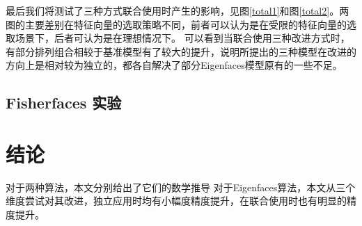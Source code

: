 \documentclass{ctexart}
\begin{document}
    最后我们将测试了三种方式联合使用时产生的影响，见图\ref{total1}和图\ref{total2}。两图的主要差别在特征向量的选取策略不同，前者可以认为是在受限的特征向量的选取场景下，后者可认为是在理想情况下。
    可以看到当联合使用三种改进方式时，有部分排列组合相较于基准模型有了较大的提升，说明所提出的三种模型在改进的方向上是相对较为独立的，都各自解决了部分Eigenfaces模型原有的一些不足。


    \subsection{Fisherfaces 实验}

    \section{结论}
    对于两种算法，本文分别给出了它们的数学推导
    对于Eigenfaces算法，本文从三个维度尝试对其改进，独立应用时均有小幅度精度提升，在联合使用时也有明显的精度提升。
    

    \newpage
    
    

    \newpage
    \appendix
\end{document}
